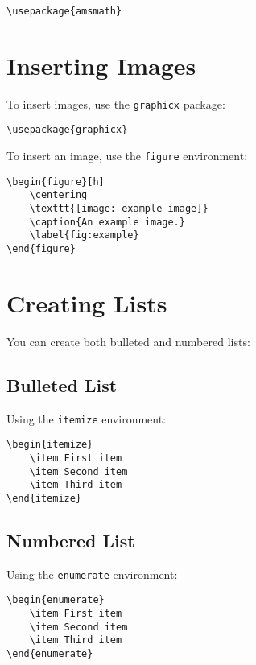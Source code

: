 \documentclass{article}
\begin{document}
\begin{verbatim}
\usepackage{amsmath}
\end{verbatim}

\section{Inserting Images}
To insert images, use the \texttt{graphicx} package:

\begin{verbatim}
\usepackage{graphicx}
\end{verbatim}

To insert an image, use the \texttt{figure} environment:

\begin{verbatim}
\begin{figure}[h]
    \centering
    \texttt{[image: example-image]}
    \caption{An example image.}
    \label{fig:example}
\end{figure}
\end{verbatim}

\section{Creating Lists}
You can create both bulleted and numbered lists:

\subsection{Bulleted List}
Using the \texttt{itemize} environment:
\begin{verbatim}
\begin{itemize}
    \item First item
    \item Second item
    \item Third item
\end{itemize}
\end{verbatim}

\subsection{Numbered List}
Using the \texttt{enumerate} environment:
\begin{verbatim}
\begin{enumerate}
    \item First item
    \item Second item
    \item Third item
\end{enumerate}
\end{verbatim}
\end{document}
